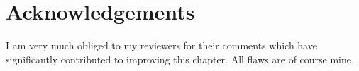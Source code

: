 \documentclass[output=paper,colorlinks,citecolor=brown]{langscibook}
\begin{document}
 

\section*{Acknowledgements}
I am very much obliged to my reviewers for their comments which have significantly contributed to improving this chapter. All flaws are of course mine.



{\sloppy\printbibliography[heading=subbibliography,notkeyword=this]}
\end{document}
